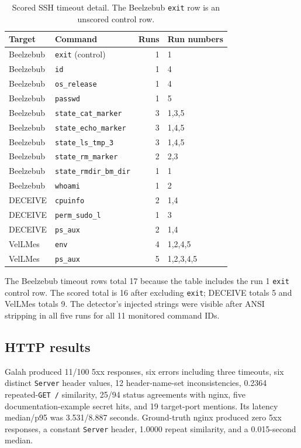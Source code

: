 \documentclass[a4paper,11pt]{article}
\begin{document}
\begin{table}[ht]
\centering
\caption{Scored SSH timeout detail. The Beelzebub \texttt{exit} row is an unscored control row.}
\label{tab:timeouts}
\scriptsize
\begin{tabularx}{\textwidth}{l l r l}
\toprule
Target & Command & Runs & Run numbers \\
\midrule
Beelzebub & \texttt{exit} (control) & 1 & 1 \\
Beelzebub & \texttt{id} & 1 & 4 \\
Beelzebub & \texttt{os\_release} & 1 & 4 \\
Beelzebub & \texttt{passwd} & 1 & 5 \\
Beelzebub & \texttt{state\_cat\_marker} & 3 & 1,3,5 \\
Beelzebub & \texttt{state\_echo\_marker} & 3 & 1,4,5 \\
Beelzebub & \texttt{state\_ls\_tmp\_3} & 3 & 1,4,5 \\
Beelzebub & \texttt{state\_rm\_marker} & 2 & 2,3 \\
Beelzebub & \texttt{state\_rmdir\_bm\_dir} & 1 & 1 \\
Beelzebub & \texttt{whoami} & 1 & 2 \\
DECEIVE & \texttt{cpuinfo} & 2 & 1,4 \\
DECEIVE & \texttt{perm\_sudo\_l} & 1 & 3 \\
DECEIVE & \texttt{ps\_aux} & 2 & 1,4 \\
VelLMes & \texttt{env} & 4 & 1,2,4,5 \\
VelLMes & \texttt{ps\_aux} & 5 & 1,2,3,4,5 \\
\bottomrule
\end{tabularx}
\end{table}

The Beelzebub timeout rows total 17 because the table includes the run 1
\texttt{exit} control row. The scored total is 16 after excluding
\texttt{exit}; DECEIVE totals 5 and VelLMes totals 9. The detector's injected
strings were visible after ANSI stripping in all five runs for all 11
monitored command IDs.

\subsection{HTTP results}

Galah produced 11/100 5xx responses, six errors including three timeouts, six
distinct \texttt{Server} header values, 12 header-name-set inconsistencies,
0.2364 repeated-\texttt{GET /} similarity, 25/94 status agreements with nginx,
five documentation-example secret hits, and 19 target-port mentions. Its
latency median/p95 was 3.531/8.887 seconds. Ground-truth nginx produced zero
5xx responses, a constant \texttt{Server} header, 1.0000 repeat similarity,
and a 0.015-second median.
\end{document}
